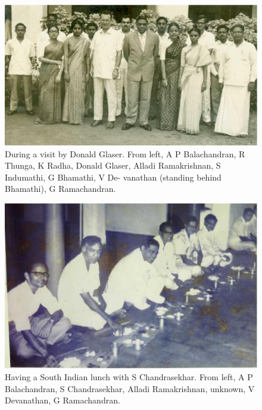 \begin{figure}[H]
\centering
\includegraphics[scale=0.3]{src/images/chap25/4.eps}
\caption{During a visit by Donald Glaser. From left, A P Balachandran, R Thunga,
K Radha, Donald Glaser, Alladi Ramakrishnan, S Indumathi, G Bhamathi, V De-
vanathan (standing behind Bhamathi), G Ramachandran.}
\end{figure}

\begin{figure}[H]
\centering
\includegraphics[scale=0.3]{src/images/chap25/5.eps}
\caption{Having a South Indian lunch with S Chandrasekhar. From left, A P
Balachandran, S Chandrasekhar, Alladi Ramakrishnan, unknown, V Devanathan, G
Ramachandran.}
\end{figure}

